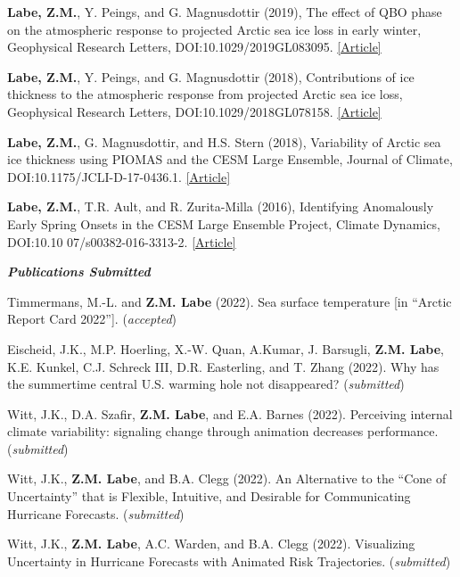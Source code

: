 \documentclass[margin,line,palatino,courier,10pt]{res}
\begin{document}
\begin{resume}
\begin{etaremune}[leftmargin=0in,topsep=0in,parsep=0in]
\item \textbf{Labe, Z.M.}, Y. Peings, and G. Magnusdottir (2019), The effect of QBO phase on the atmospheric response to projected Arctic sea ice loss in early winter, Geophysical Research Letters, DOI:10.1029/2019GL083095. \href{https://agupubs.onlinelibrary.wiley.com/doi/10.1029/2019GL083095}{[Article]}
\item \textbf{Labe, Z.M.}, Y. Peings, and G. Magnusdottir (2018), Contributions of ice thickness to the atmospheric response from projected Arctic sea ice loss, Geophysical Research Letters, DOI:10.1029/2018GL078158. \href{https://agupubs.onlinelibrary.wiley.com/doi/10.1029/2018GL078158}{[Article]}
\item \textbf{Labe, Z.M.}, G. Magnusdottir, and H.S. Stern (2018), Variability of Arctic sea ice thickness using PIOMAS and the CESM Large Ensemble, Journal of Climate, DOI:10.1175/JCLI-D-17-0436.1. \href{https://journals.ametsoc.org/doi/abs/10.1175/JCLI-D-17-0436.1}{[Article]}
\item \textbf{Labe, Z.M.}, T.R. Ault, and R. Zurita-Milla (2016), Identifying Anomalously Early Spring Onsets in the CESM Large Ensemble Project, Climate Dynamics, DOI:10.10 07/s00382-016-3313-2. \href{http://link.springer.com/article/10.1007/s00382-016-3313-2}{[Article]}
\end{etaremune}

\textit{\textbf{Publications Submitted}}
\vspace*{-0.1in}\\
\begin{etaremune}[leftmargin=0in,topsep=0in,parsep=0in]
\item Timmermans, M.-L. and \textbf{Z.M. Labe} (2022). Sea surface temperature [in ``Arctic Report Card 2022'']. (\textit{accepted})
\item Eischeid, J.K., M.P. Hoerling, X.-W. Quan, A.Kumar, J. Barsugli, \textbf{Z.M. Labe}, K.E. Kunkel, C.J. Schreck III, D.R. Easterling, and T. Zhang (2022). Why has the summertime central U.S. warming hole not disappeared? (\textit{submitted})
\item Witt, J.K., D.A. Szafir, \textbf{Z.M. Labe}, and E.A. Barnes (2022). Perceiving internal climate variability: signaling change through animation decreases performance. (\textit{submitted})
\item Witt, J.K., \textbf{Z.M. Labe}, and B.A. Clegg (2022). An Alternative to the ``Cone of Uncertainty'' that is Flexible, Intuitive, and Desirable for Communicating Hurricane Forecasts. (\textit{submitted})
\item Witt, J.K., \textbf{Z.M. Labe}, A.C. Warden, and B.A. Clegg (2022). Visualizing Uncertainty in Hurricane Forecasts with Animated Risk Trajectories. (\textit{submitted})
\end{etaremune}


\end{resume}
\end{document}
